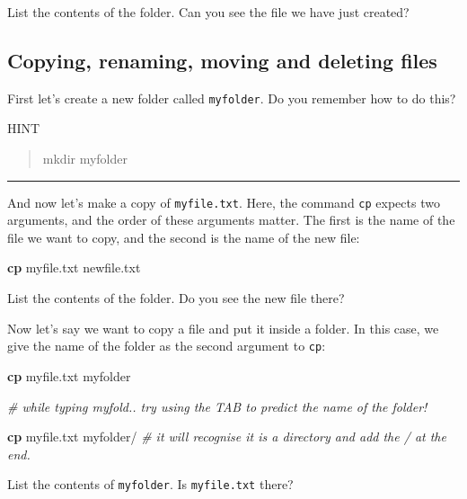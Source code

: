 \documentclass[
]{book}
\newenvironment{Shaded}{\begin{snugshade}}{\end{snugshade}}
\newcommand{\CommentTok}[1]{\textcolor[rgb]{0.56,0.35,0.01}{\textit{#1}}}
\newcommand{\FunctionTok}[1]{\textcolor[rgb]{0.13,0.29,0.53}{\textbf{#1}}}
\newcommand{\NormalTok}[1]{#1}
\begin{document}
List the contents of the folder. Can you see the file we have just created?

\hypertarget{copying-renaming-moving-and-deleting-files}{%
\subsection{Copying, renaming, moving and deleting files}\label{copying-renaming-moving-and-deleting-files}}

First let's create a new folder called \texttt{myfolder}. Do you remember how to do this?

HINT

\begin{quote}
mkdir myfolder
\end{quote}

\begin{center}\rule{0.5\linewidth}{0.5pt}\end{center}

And now let's make a copy of \texttt{myfile.txt}. Here, the command \texttt{cp} expects two arguments, and the order of these arguments matter. The first is the name of the file we want to copy, and the second is the name of the new file:

\begin{Shaded}
\begin{Highlighting}[]
\FunctionTok{cp}\NormalTok{ myfile.txt newfile.txt}
\end{Highlighting}
\end{Shaded}

List the contents of the folder. Do you see the new file there?

Now let's say we want to copy a file and put it inside a folder. In this case, we give the name of the folder as the second argument to \texttt{cp}:

\begin{Shaded}
\begin{Highlighting}[]
\FunctionTok{cp}\NormalTok{ myfile.txt myfolder }

\CommentTok{\# while typing myfold.. try using the TAB to predict the name of the folder!}

\FunctionTok{cp}\NormalTok{ myfile.txt myfolder/  }\CommentTok{\# it will recognise it is a directory and add the / at the end.}
\end{Highlighting}
\end{Shaded}

List the contents of \texttt{myfolder}. Is \texttt{myfile.txt} there?
\end{document}

